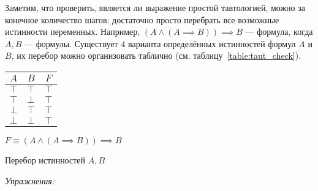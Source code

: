 Заметим, что проверить, является ли выражение простой тавтологией,
можно за конечное количество шагов: достаточно просто перебрать все возможные истинности
переменных.
Например, ${(A\land (A\implies B))\implies B}$ --- формула, когда $A,B$ --- формулы.
Существует $4$ варианта определённых истинностей формул $A$ и $B$,
их перебор можно организовать таблично (см. таблицу~\ref{table:taut_check}).
\begin{margintable}
	\begin{tabular}{cc|c}
		$A$    & $B$    & $F$    \\\hline
		$\top$ & $\top$ & $\top$ \\
		$\top$ & $\bot$ & $\top$ \\
		$\bot$ & $\top$ & $\top$ \\
		$\bot$ & $\bot$ & $\top$
	\end{tabular}

	\vspace{0.5em}
	$F\equiv{(A\land (A\implies B))\implies B}$

	\caption{Перебор истинностей $A,B$}\label{table:taut_check}
\end{margintable}

\vspace{1em}
{\it Упражнения:}

